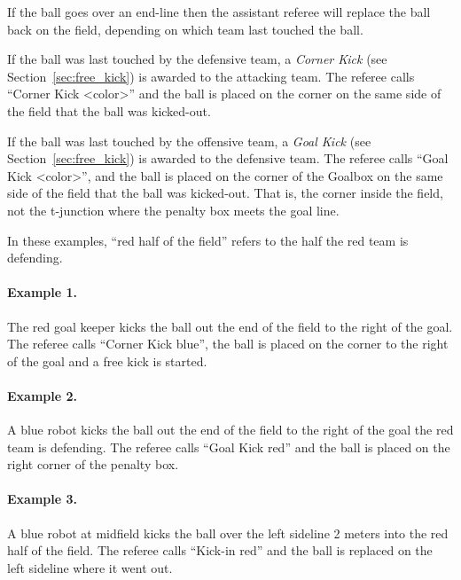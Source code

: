 \documentclass[12pt]{article}
\newcommand{\cf}{see\xspace}
\begin{document}
If the ball goes over an end-line then the assistant referee will replace the ball back on the field, depending on which team last touched the ball.

If the ball was last touched by the defensive team, a \emph{Corner Kick} (\cf Section~\ref{sec:free_kick}) is awarded to the attacking team. The referee calls ``Corner Kick \textless color\textgreater'' and the ball is placed on the corner on the same side of the field that the ball was kicked-out.

If the ball was last touched by the offensive team, a \emph{Goal Kick} (\cf Section~\ref{sec:free_kick}) is awarded to the defensive team. The referee calls ``Goal Kick \textless color\textgreater'', and the ball is placed on the corner of the Goalbox on the same side of the field that the ball was kicked-out. That is, the corner inside the field, not the t-junction where the penalty box meets the goal line.


In these examples, ``red half of the field'' refers to the half the red team is defending.

\paragraph{Example 1.} The red goal keeper kicks the ball out the end of the field to the right of the goal. The referee calls ``Corner Kick blue'', the ball is placed on the corner to the right of the goal and a free kick is started.

\paragraph{Example 2.} A blue robot kicks the ball out the end of the field to the right of the goal the red team is defending. The referee calls ``Goal Kick red'' and the ball is placed on the right corner of the penalty box.

\paragraph{Example 3.} A blue robot at midfield kicks the ball over the left sideline 2 meters into the red half of the field. The referee calls ``Kick-in red'' and the ball is replaced on the left sideline where it went out.
\end{document}
